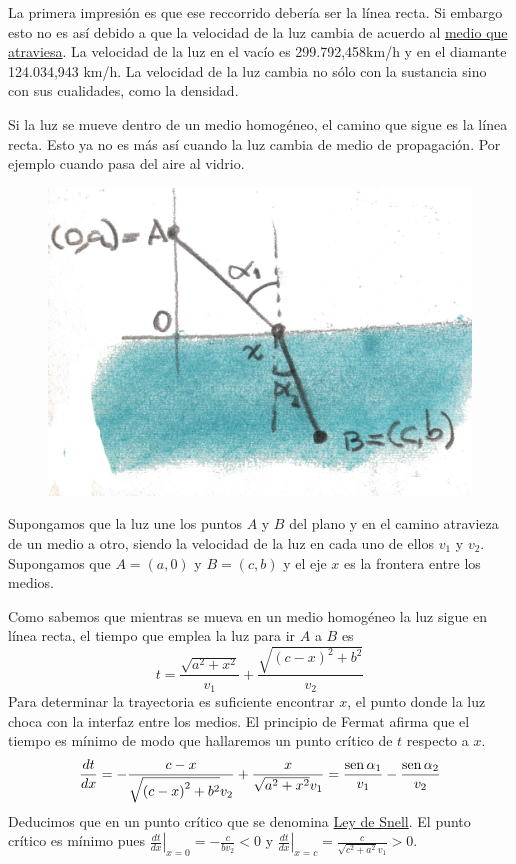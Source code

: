  La primera impresión   es que ese reccorrido debería ser la línea recta. Si embargo esto no es así debido a que la velocidad de la luz cambia
de acuerdo al \href{http://es.wikipedia.org/wiki/Velocidad_de_la_luz_en_un_medio_material}{medio que atraviesa}. 
La velocidad de la luz en el vacío es 299.792,458km/h y en el diamante 124.034,943 km/h. La velocidad de la luz cambia no sólo con la sustancia sino con sus cualidades, 
como la densidad. 

 Si la luz se mueve dentro de un medio homogéneo, el camino que sigue es la línea recta. Esto ya no es más así cuando la luz cambia de medio de propagación. Por ejemplo
cuando pasa del aire al vidrio. 

\begin{figure}
\hspace{-1cm}
\begin{center}
    \includegraphics[scale=.07]{imagenes/refraccion.jpg}
  \end{center}
\end{figure}
 Supongamos que la luz une los puntos $A$ y $B$ del plano y en el camino atravieza de un medio a otro, siendo la velocidad
 de la luz en cada uno de ellos $v_1$ y $v_2$.  Supongamos que $A=(a,0)$ y $B=(c,b)$ y el eje $x$ es la frontera entre los medios.

Como sabemos que mientras se mueva en un medio homogéneo la luz sigue en línea recta,
el tiempo que emplea la luz para ir $A$ a $B$ es
 \[t=\frac{\sqrt{a^{2} + x^{2}}}{v_{1}} + \frac{\sqrt{{\left(c - x\right)}^{2} + b^{2}}}{v_{2}}\]
Para determinar la trayectoria es suficiente encontrar $x$, el punto donde la luz choca con la interfaz entre los medios. 
El principio de Fermat afirma que el tiempo es mínimo de modo que hallaremos un punto crítico de $t$ respecto a $x$. 
\[ \frac{dt}{dx}=-\frac{c - x}{\sqrt{{\left(c - x\right)}^{2} + b^{2}} v_{2}} +
\frac{x}{\sqrt{a^{2} + x^{2}} v_{1}}=\frac{\sen\alpha_1}{v_1}-\frac{\sen\alpha_2}{v_2} \]
Deducimos que en un punto crítico 
que se denomina \href{http://es.wikipedia.org/wiki/Ley_de_Snell}{Ley de Snell}. El punto crítico es mínimo pues $\left.\frac{dt}{dx}\right|_{x=0}=-\tfrac{c}{bv_2}<0$ y
$\left.\frac{dt}{dx}\right|_{x=c}=\tfrac{c}{\sqrt{c^2+a^2}v_1}>0$.

